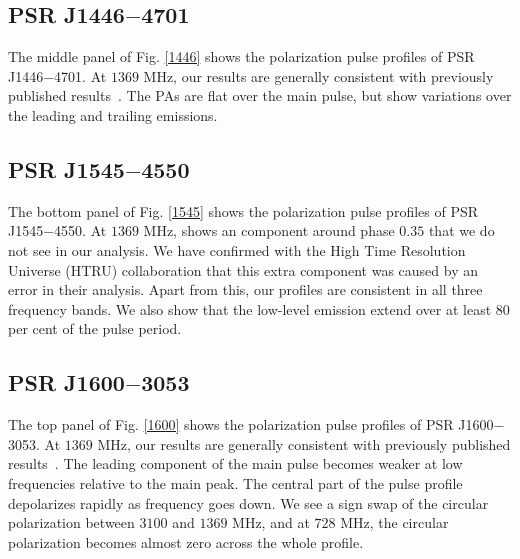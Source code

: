 \documentclass[useAMS,usenatbib]{mn2e}
\begin{document}
\begin{appendices}

\subsection{PSR J1446$-$4701}

The middle panel of Fig. \ref{1446} shows the polarization pulse profiles of 
PSR J1446$-$4701.
%
At $1369$ MHz, our results are generally consistent with previously published
results~\citep{Keith12}.
%
The PAs are flat over the main pulse, but show variations over the leading and 
trailing emissions.
%

\subsection{PSR J1545$-$4550}

The bottom panel of Fig. \ref{1545} shows the polarization pulse profiles of 
PSR J1545$-$4550.
%
At $1369$ MHz, \citet{Burgay13} shows an component around phase $0.35$ that 
we do not see in our analysis. We have confirmed with the High Time Resolution 
Universe (HTRU) collaboration that this extra component was caused by an error 
in their analysis.  
%
Apart from this, our profiles are consistent in all three frequency bands.
%
We also show that the low-level emission extend over at least $80$ 
per cent of the pulse period.

\subsection{PSR J1600$-$3053}

The top panel of Fig. \ref{1600} shows the polarization pulse profiles of 
PSR J1600$-$3053.
%
At $1369$ MHz, our results are generally consistent with previously published
results~\citep{Ord04,Yan11}.
%
The leading component of the main pulse becomes weaker at low frequencies 
relative to the main peak.
%
The central part of the pulse profile depolarizes rapidly as frequency goes 
down. 
%
We see a sign swap of the circular polarization between $3100$ and 
$1369$ MHz, and at $728$ MHz, the circular polarization becomes almost 
zero across the whole profile.


\end{appendices}
\end{document}
